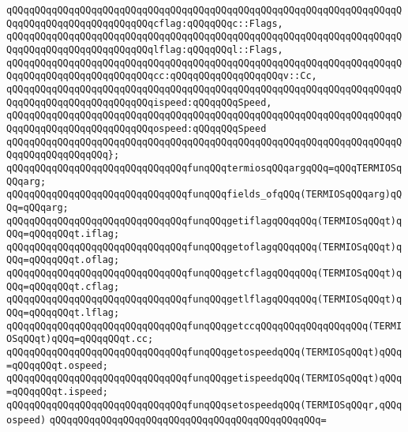 \verb|qQQqqQQqqQQqqQQqqQQqqQQqqQQqqQQqqQQqqQQqqQQqqQQqqQQqqQQqqQQqqQQqqQQqqQQqqQQqqQQqqQQqqQQqqQQqqQQqcflag:qQQqqQQqc::Flags,|\newline
\verb|qQQqqQQqqQQqqQQqqQQqqQQqqQQqqQQqqQQqqQQqqQQqqQQqqQQqqQQqqQQqqQQqqQQqqQQqqQQqqQQqqQQqqQQqqQQqqQQqlflag:qQQqqQQql::Flags,|\newline
\verb|qQQqqQQqqQQqqQQqqQQqqQQqqQQqqQQqqQQqqQQqqQQqqQQqqQQqqQQqqQQqqQQqqQQqqQQqqQQqqQQqqQQqqQQqqQQqqQQqcc:qQQqqQQqqQQqqQQqqQQqv::Cc,|\newline
\verb|qQQqqQQqqQQqqQQqqQQqqQQqqQQqqQQqqQQqqQQqqQQqqQQqqQQqqQQqqQQqqQQqqQQqqQQqqQQqqQQqqQQqqQQqqQQqqQQqispeed:qQQqqQQqSpeed,|\newline
\verb|qQQqqQQqqQQqqQQqqQQqqQQqqQQqqQQqqQQqqQQqqQQqqQQqqQQqqQQqqQQqqQQqqQQqqQQqqQQqqQQqqQQqqQQqqQQqqQQqospeed:qQQqqQQqSpeed|\newline
\verb|qQQqqQQqqQQqqQQqqQQqqQQqqQQqqQQqqQQqqQQqqQQqqQQqqQQqqQQqqQQqqQQqqQQqqQQqqQQqqQQqqQQqqQQq};|\newline
\newline
\verb|qQQqqQQqqQQqqQQqqQQqqQQqqQQqqQQqfunqQQqtermiosqQQqargqQQq=qQQqTERMIOSqQQqarg;|\newline
\verb|qQQqqQQqqQQqqQQqqQQqqQQqqQQqqQQqfunqQQqfields_ofqQQq(TERMIOSqQQqarg)qQQq=qQQqarg;|\newline
\newline
\verb|qQQqqQQqqQQqqQQqqQQqqQQqqQQqqQQqfunqQQqgetiflagqQQqqQQq(TERMIOSqQQqt)qQQq=qQQqqQQqt.iflag;|\newline
\verb|qQQqqQQqqQQqqQQqqQQqqQQqqQQqqQQqfunqQQqgetoflagqQQqqQQq(TERMIOSqQQqt)qQQq=qQQqqQQqt.oflag;|\newline
\verb|qQQqqQQqqQQqqQQqqQQqqQQqqQQqqQQqfunqQQqgetcflagqQQqqQQq(TERMIOSqQQqt)qQQq=qQQqqQQqt.cflag;|\newline
\verb|qQQqqQQqqQQqqQQqqQQqqQQqqQQqqQQqfunqQQqgetlflagqQQqqQQq(TERMIOSqQQqt)qQQq=qQQqqQQqt.lflag;|\newline
\verb|qQQqqQQqqQQqqQQqqQQqqQQqqQQqqQQqfunqQQqgetccqQQqqQQqqQQqqQQqqQQq(TERMIOSqQQqt)qQQq=qQQqqQQqt.cc;|\newline
\verb|qQQqqQQqqQQqqQQqqQQqqQQqqQQqqQQqfunqQQqgetospeedqQQq(TERMIOSqQQqt)qQQq=qQQqqQQqt.ospeed;|\newline
\verb|qQQqqQQqqQQqqQQqqQQqqQQqqQQqqQQqfunqQQqgetispeedqQQq(TERMIOSqQQqt)qQQq=qQQqqQQqt.ispeed;|\newline
\newline
\verb|qQQqqQQqqQQqqQQqqQQqqQQqqQQqqQQqfunqQQqsetospeedqQQq(TERMIOSqQQqr,qQQqospeed)|\newline
\verb|qQQqqQQqqQQqqQQqqQQqqQQqqQQqqQQqqQQqqQQqqQQqqQQq=|\newline
